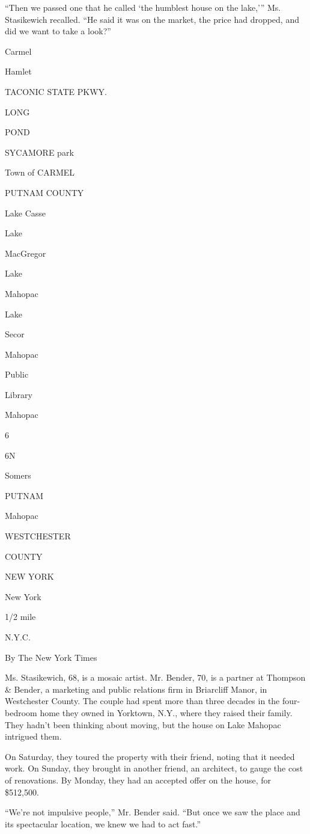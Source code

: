 ``Then we passed one that he called `the humblest house on the lake,'''
Ms. Stasikewich recalled. ``He said it was on the market, the price had
dropped, and did we want to take a look?''

Carmel

Hamlet

TACONIC STATE PKWY.

LONG

POND

SYCAMORE park

Town of CARMEL

PUTNAM COUNTY

Lake Casse

Lake

MacGregor

Lake

Mahopac

Lake

Secor

Mahopac

Public

Library

Mahopac

6

6N

Somers ~

PUTNAM

Mahopac

WESTCHESTER

COUNTY

NEW YORK

New York

1/2 mile

N.Y.C.

By The New York Times

Ms. Stasikewich, 68, is a mosaic artist. Mr. Bender, 70, is a partner at
Thompson \& Bender, a marketing and public relations firm in Briarcliff
Manor, in Westchester County. The couple had spent more than three
decades in the four-bedroom home they owned in Yorktown, N.Y., where
they raised their family. They hadn't been thinking about moving, but
the house on Lake Mahopac intrigued them.

On Saturday, they toured the property with their friend, noting that it
needed work. On Sunday, they brought in another friend, an architect, to
gauge the cost of renovations. By Monday, they had an accepted offer on
the house, for \$512,500.

``We're not impulsive people,'' Mr. Bender said. ``But once we saw the
place and its spectacular location, we knew we had to act fast.''


